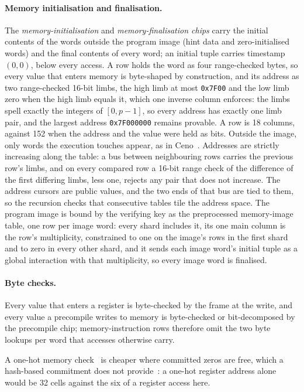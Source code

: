 \paragraph{Memory initialisation and finalisation.} The \emph{memory-initialisation} and \emph{memory-finalisation chips} carry the initial contents of the words outside the program image (hint data and zero-initialised words) and the final contents of every word; an initial tuple carries timestamp $(0, 0)$, below every access. A row holds the word as four range-checked bytes, so every value that enters memory is byte-shaped by construction, and its address as two range-checked 16-bit limbs, the high limb at most \texttt{0x7F00} and the low limb zero when the high limb equals it, which one inverse column enforces: the limbs spell exactly the integers of $[0, p-1]$, so every address has exactly one limb pair, and the largest address \texttt{0x7F000000} remains provable. A row is 18 columns, against 152 when the address and the value were held as bits. Outside the image, only words the execution touches appear, as in Ceno~\citep[\S5.1]{ceno}. Addresses are strictly increasing along the table: a bus between neighbouring rows carries the previous row's limbs, and on every compared row a 16-bit range check of the difference of the first differing limbs, less one, rejects any pair that does not increase. The address cursors are public values, and the two ends of that bus are tied to them, so the recursion checks that consecutive tables tile the address space. The program image is bound by the verifying key as the preprocessed memory-image table, one row per image word: every shard includes it, its one main column is the row's multiplicity, constrained to one on the image's rows in the first shard and to zero in every other shard, and it sends each image word's initial tuple as a global interaction with that multiplicity, so every image word is finalised.

\paragraph{Byte checks.} Every value that enters a register is byte-checked by the frame at the write, and every value a precompile writes to memory is byte-checked or bit-decomposed by the precompile chip; memory-instruction rows therefore omit the two byte lookups per word that accesses otherwise carry.

A one-hot memory check~\citep{twist-shout} is cheaper where committed zeros are free, which a hash-based commitment does not provide~\citep[\S2.9]{twist-shout}: a one-hot register address alone would be 32 cells against the six of a register access here.

